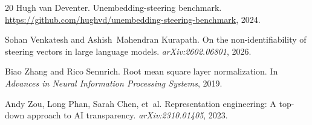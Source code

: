 \begin{thebibliography}{20}
Hugh van Deventer.
\newblock Unembedding-steering benchmark.
\newblock \url{https://github.com/hughvd/unembedding-steering-benchmark}, 2024.

Sohan Venkatesh and Ashish~Mahendran Kurapath.
\newblock On the non-identifiability of steering vectors in large language models.
\newblock \emph{arXiv:2602.06801}, 2026.

Biao Zhang and Rico Sennrich.
\newblock Root mean square layer normalization.
\newblock In \emph{Advances in Neural Information Processing Systems}, 2019.

Andy Zou, Long Phan, Sarah Chen, et~al.
\newblock Representation engineering: A top-down approach to {AI} transparency.
\newblock \emph{arXiv:2310.01405}, 2023.

\end{thebibliography}

